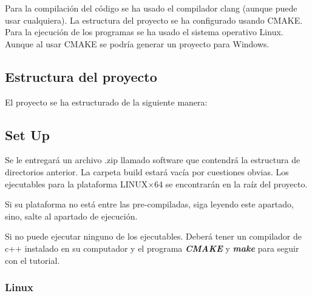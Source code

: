 \documentclass[a4paper, 12.5pt]{report}
\begin{document}
Para la compilación del código se ha usado el compilador clang (aunque puede usar cualquiera). La estructura del proyecto se ha configurado usando CMAKE. Para la ejecución de los programas se ha usado el sistema operativo Linux. Aunque al usar CMAKE se podría generar un proyecto para Windows.

\subsection{Estructura del proyecto}

El proyecto se ha estructurado de la siguiente manera:




\subsection{Set Up} \label{subsec:set-up}

Se le entregará un archivo .zip llamado software que contendrá la estructura de directorios anterior. La carpeta build estará vacía por cuestiones obvias. Los ejecutables para la plataforma LINUX$\times$64 se encontrarán en la raíz del proyecto.

Si su plataforma no está entre las pre-compiladas, siga leyendo este apartado, sino, salte al apartado de ejecución.

Si no puede ejecutar ninguno de los ejecutables. Deberá tener un compilador de c++ instalado en su computador y el programa \textbf{\textit{CMAKE}} y \textbf{\textit{make}}  para seguir con el tutorial.


\subsubsection*{Linux}
\end{document}
